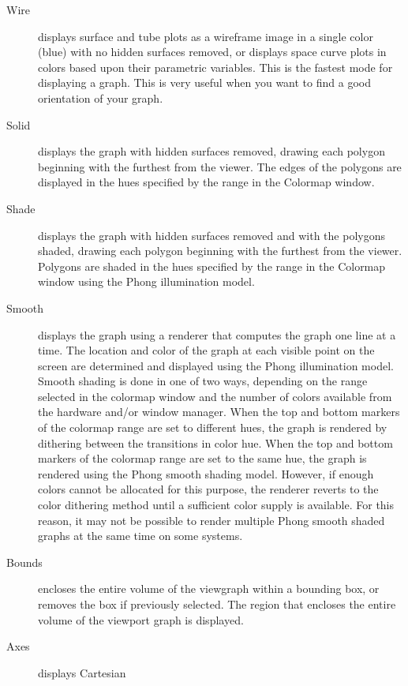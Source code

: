\begin{description}
%
\item[Wire] displays surface and tube plots as a
wireframe image in a single color (blue) with no hidden surfaces removed,
or displays space curve plots in colors based upon their parametric variables.
This is the fastest mode for displaying a graph.
This is very useful when you
want to find a good orientation of your graph.
%
\item[Solid] displays the graph with hidden
surfaces removed, drawing each polygon beginning with the furthest
from the viewer.
The edges of the polygons are displayed in the hues specified by
the range in the Colormap window.
%
\item[Shade] displays the graph with hidden
surfaces removed and with the polygons shaded, drawing each
polygon beginning with the furthest from the viewer.
Polygons are shaded in the hues specified by the range in the
Colormap window using the Phong illumination model.
%
\item[Smooth] displays the graph using a
renderer that computes the graph one line at a time.
The location and color of the graph at each visible point on the
screen are determined and displayed using the Phong illumination
model.
Smooth shading is done in one of two ways, depending on the range
selected in the colormap window and the number of colors available
from the hardware and/or window manager.
When the top and bottom markers of the colormap range are set to
different hues, the graph is rendered by dithering between the
transitions in color hue.
When the top and bottom markers of the colormap range are set to
the same hue, the graph is rendered using the Phong smooth shading
model.
However, if enough colors cannot be allocated for this purpose,
the renderer reverts to the color dithering method until a
sufficient color supply is available.
For this reason, it may not be possible to render multiple Phong
smooth shaded graphs at the same time on some systems.
%
\item[Bounds] encloses the entire volume of the
viewgraph within a bounding box, or removes the box if previously selected.
The region that encloses the entire volume of the viewport graph is displayed.
%
\item[Axes] displays Cartesian

\end{description}
